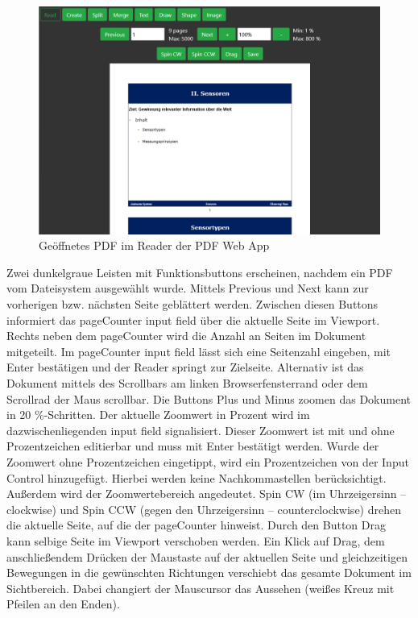 \begin{figure}[!htbp]
	\centering
	\includegraphics[width=1\textwidth]{"images/reader.png"}
	\caption{Geöffnetes PDF im Reader der PDF Web App}
	\label{fig:reader}
\end{figure}

Zwei dunkelgraue Leisten mit Funktionsbuttons erscheinen, nachdem ein PDF vom Dateisystem ausgewählt wurde. Mittels Previous und Next kann zur vorherigen bzw. nächsten Seite geblättert werden. Zwischen diesen Buttons informiert das pageCounter input field über die aktuelle Seite im Viewport. Rechts neben dem pageCounter wird die Anzahl an Seiten im Dokument mitgeteilt. Im pageCounter input field lässt sich eine Seitenzahl eingeben, mit Enter bestätigen und der Reader springt zur Zielseite. Alternativ ist das Dokument mittels des Scrollbars am linken Browserfensterrand oder dem Scrollrad der Maus scrollbar. Die Buttons Plus und Minus zoomen das Dokument in 20 \%-Schritten. Der aktuelle Zoomwert in Prozent wird im dazwischenliegenden input field signalisiert. Dieser Zoomwert ist mit und ohne Prozentzeichen editierbar und muss mit Enter bestätigt werden. Wurde der Zoomwert ohne Prozentzeichen eingetippt, wird ein Prozentzeichen von der Input Control hinzugefügt. Hierbei werden keine Nachkommastellen berücksichtigt. Außerdem wird der Zoomwertebereich angedeutet. Spin CW (im Uhrzeigersinn – clockwise) und Spin CCW (gegen den Uhrzeigersinn – counterclockwise) drehen die aktuelle Seite, auf die der pageCounter hinweist. Durch den Button Drag kann selbige Seite im Viewport verschoben werden. Ein Klick auf Drag, dem anschließendem Drücken der Maustaste auf der aktuellen Seite und gleichzeitigen Bewegungen in die gewünschten Richtungen verschiebt das gesamte Dokument im Sichtbereich. Dabei changiert der Mauscursor das Aussehen (weißes Kreuz mit Pfeilen an den Enden).


